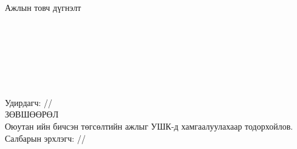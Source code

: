 \begin{titlepage}
\begin{center}
\vspace{1cm}
Ажлын товч дүгнэлт \\[0.5cm]
\dotfill \\[0.2cm]
\dotfill \\[0.2cm]
\dotfill \\[0.2cm]
\dotfill \\[0.2cm]
\dotfill \\[0.2cm]
\dotfill \\[0.2cm]
\dotfill \\[0.5cm]
Удирдагч: \makebox[3cm]{\dotfill} /\supname/ \\

\vspace{2cm}
ЗӨВШӨӨРӨЛ \\[0.5cm]
Оюутан \shortname ийн бичсэн төгсөлтийн ажлыг УШК-д хамгаалуулахаар тодорхойлов.\\[0.5cm]
Салбарын эрхлэгч: \makebox[3cm]{\dotfill} /\chairname/
\end{center}

\end{titlepage}

\newpage

\newpage

